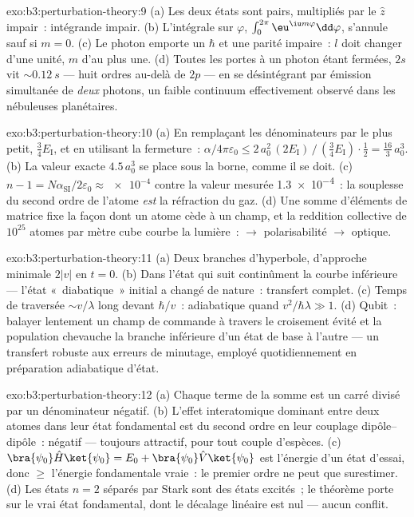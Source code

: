 \begin{solution}{exo:b3:perturbation-theory:9}
(a) Les deux états sont pairs, multipliés par le $\hat z$ impair~:
intégrande impair. (b) L'intégrale sur $\varphi$,
$\int_0^{2\pi}\eu^{\iu m\varphi}\dd\varphi$, s'annule sauf si $m = 0$.
(c) Le photon emporte un $\hbar$ et une parité impaire~: $l$ doit
changer d'une unité, $m$ d'au plus une. (d) Toutes les portes à un
photon étant fermées, $2s$ vit $\sim\qty{0.12}{s}$ --- huit ordres
au-delà de $2p$ --- en se désintégrant par émission simultanée de
\emph{deux} photons, un faible continuum effectivement observé dans
les nébuleuses planétaires.
\end{solution}

\begin{solution}{exo:b3:perturbation-theory:10}
(a) En remplaçant les dénominateurs par le plus petit, $\tfrac34
E_{\text{I}}$, et en utilisant la fermeture~:
$\alpha/4\pi\varepsilon_0 \le
2\,a_0^2\,(2E_{\text{I}})\,/\,(\tfrac34 E_{\text{I}})\cdot\tfrac12
= \tfrac{16}3\,a_0^3$. (b) La valeur exacte $4.5\,a_0^3$ se place
sous la borne, comme il se doit. (c) $n - 1 = N\alpha_{\text{SI}}/2\varepsilon_0
\approx \num{e-4}$ contre la valeur mesurée \num{1.3e-4}~: la
souplesse du second ordre de l'atome \emph{est} la réfraction du gaz.
(d) Une somme d'éléments de matrice fixe la façon dont un atome cède à
un champ, et la reddition collective de $10^{25}$ atomes par mètre
cube courbe la lumière~:  $\to$
polarisabilité $\to$ optique.
\end{solution}

\begin{solution}{exo:b3:perturbation-theory:11}
(a) Deux branches d'hyperbole, d'approche minimale $2|v|$ en $t = 0$.
(b) Dans l'état qui suit continûment la courbe inférieure --- l'état
«~diabatique~» initial a changé de nature~: transfert complet. (c)
Temps de traversée $\sim v/\lambda$ long devant $\hbar/v$~:
adiabatique quand $v^2/\hbar\lambda \gg 1$. (d) Qubit~: balayer
lentement un champ de commande à travers le croisement évité et la
population chevauche la branche inférieure d'un état de base à
l'autre --- un transfert robuste aux erreurs de minutage, employé
quotidiennement en préparation adiabatique d'état.
\end{solution}

\begin{solution}{exo:b3:perturbation-theory:12}
(a) Chaque terme de la somme est un carré divisé par un dénominateur
négatif. (b) L'effet interatomique dominant entre deux atomes dans
leur état fondamental est du second ordre en leur couplage
dipôle--dipôle~: négatif --- toujours attractif, pour tout couple
d'espèces. (c) $\bra{\psi_0}\hat H\ket{
\psi_0} = E_0 + \bra{\psi_0}\hat V\ket{\psi_0}$ est l'énergie d'un
état d'essai, donc $\ge$ l'énergie fondamentale vraie~: le premier
ordre ne peut que surestimer. (d) Les états $n = 2$ séparés par Stark
sont des états excités~; le théorème porte sur le vrai état
fondamental, dont le décalage linéaire est nul --- aucun conflit.
\end{solution}

